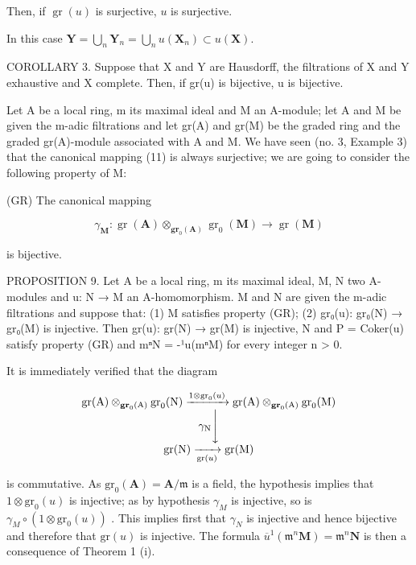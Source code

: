 Then, if \(\operatorname{gr}(u)\) is surjective, \(u\) is surjective.

In this case \(\mathbf{Y} = \bigcup_{n}\mathbf{Y}_{n} = \bigcup_{n}u(\mathbf{X}_{n})\subset u(\mathbf{X}).\)

COROLLARY 3. Suppose that X and Y are Hausdorff, the filtrations of X and Y exhaustive and X complete. Then, if gr(u) is bijective, u is bijective.

Let A be a local ring, m its maximal ideal and M an A-module; let A and M be given the m-adic filtrations and let gr(A) and gr(M) be the graded ring and the graded gr(A)-module associated with A and M. We have seen (no. 3, Example 3) that the canonical mapping (11) is always surjective; we are going to consider the following property of M:

(GR) The canonical mapping

\[
\gamma_ {\mathbf {M}} \colon \operatorname{gr} (\mathbf {A}) \otimes_ {\mathbf {g r} _ {0} (\mathbf {A})} \operatorname{gr} _ {0} (\mathbf {M}) \rightarrow \operatorname{gr} (\mathbf {M})
\]

is bijective.

PROPOSITION 9. Let A be a local ring, m its maximal ideal, M, N two A-modules and u: N → M an A-homomorphism. M and N are given the m-adic filtrations and suppose that: (1) M satisfies property (GR); (2) gr₀(u): gr₀(N) → gr₀(M) is injective. Then gr(u): gr(N) → gr(M) is injective, N and P = Coker(u) satisfy property (GR) and mⁿN = -¹u(mⁿM) for every integer n \textgreater{} 0.

It is immediately verified that the diagram

\[
\begin{array}{c} \operatorname{gr} (\mathrm{A}) \otimes_ {\mathbf {g r} _ {0} (\mathrm{A})} \operatorname{gr} _ {0} (\mathrm{N}) \xrightarrow {1 \otimes \operatorname{gr} _ {0} (u)} \operatorname{gr} (\mathrm{A}) \otimes_ {\mathbf {g r} _ {0} (\mathrm{A})} \operatorname{gr} _ {0} (\mathrm{M}) \\ \gamma_ {\mathrm{N}} \Biggl \downarrow \\ \operatorname{gr} (\mathrm{N}) \xrightarrow [ \operatorname{gr} (u) ]{} \operatorname{gr} (\mathrm{M}) \end{array}
\]

is commutative. As \(\mathrm{gr}_{0}(\mathbf{A}) = \mathbf{A}/\mathfrak{m}\) is a field, the hypothesis implies that \(1 \otimes \mathrm{gr}_{0}(u)\) is injective; as by hypothesis \(\gamma_{M}\) is injective, so is \(\gamma_{M} \circ (1 \otimes \mathrm{gr}_{0}(u))\) . This implies first that \(\gamma_{N}\) is injective and hence bijective and therefore that \(\mathrm{gr}(u)\) is injective. The formula \(\overline{u}^{1}(\mathfrak{m}^{n}\mathbf{M}) = \mathfrak{m}^{n}\mathbf{N}\) is then a consequence of Theorem 1 (i).

